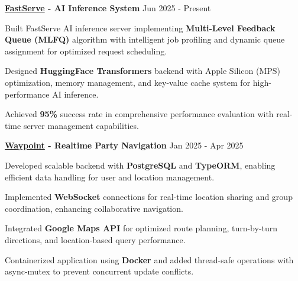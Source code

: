 \vspace{-3.0mm}

\begin{cventries}
\setlength{\extrarowheight}{2mm}

\cventry
    {\textbf{\href{https://github.com/howwyhoward/FastServe}{FastServe} - AI Inference System}} %
    {} %
    {} %
    {Jun 2025 - Present} %
    { %
        \begin{cvitems}
            \item {Built FastServe AI inference server implementing \textbf{Multi-Level Feedback Queue (MLFQ)} algorithm with intelligent job profiling and dynamic queue assignment for optimized request scheduling.}
            \item {Designed \textbf{HuggingFace Transformers} backend with Apple Silicon (MPS) optimization, memory management, and key-value cache system for high-performance AI inference.}
            \item {Achieved \textbf{95\%} success rate in comprehensive performance evaluation with real-time server management capabilities.}
        \end{cvitems}  
    }

\vspace{2mm}
\cventry  
    {\textbf{\href{https://github.com/khanna-parth/MapsProject}{Waypoint} - Realtime Party Navigation}} %
    {} %
    {} %
    {Jan 2025 - Apr 2025} %
    { %
        \begin{cvitems}  
            \item {Developed scalable backend with \textbf{PostgreSQL} and \textbf{TypeORM}, enabling efficient data handling for user and location management.}  
            \item {Implemented \textbf{WebSocket} connections for real-time location sharing and group coordination, enhancing collaborative navigation.}  
            \item {Integrated \textbf{Google Maps API} for optimized route planning, turn-by-turn directions, and location-based query performance.} 
            \item {Containerized application using \textbf{Docker} and added thread-safe operations with async-mutex to prevent concurrent update conflicts.}   
        \end{cvitems}  
    }


\end{cventries}
